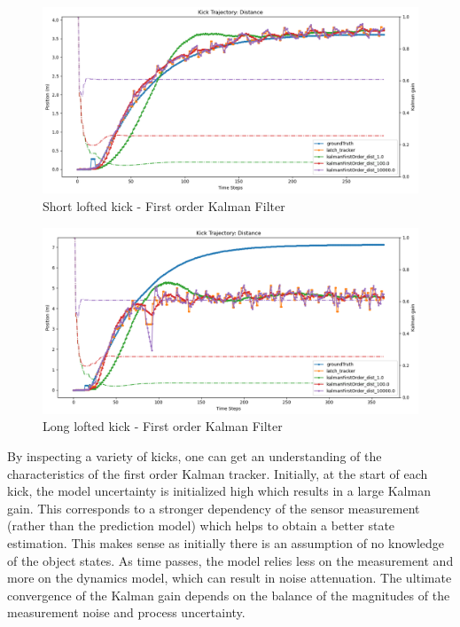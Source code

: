 \documentclass[a4paper,twoside,12pt]{report}
\begin{document}
\begin{figure}[h!]
\begin{center}
\includegraphics[width=12cm]{images/fok_loft_short.png}
\caption{Short lofted kick - First order Kalman Filter}
\label{fig:fokloftshort}
\end{center}
\end{figure}

\begin{figure}[h!]
\begin{center}
\includegraphics[width=12cm]{images/fok_loft_long.png}
\caption{Long lofted kick - First order Kalman Filter}
\label{fig:fokloftlong}
\end{center}
\end{figure}

By inspecting a variety of kicks, one can get an understanding of the characteristics of the first order Kalman tracker. Initially, at the start of each kick, the model uncertainty is initialized high which results in a large Kalman gain. This corresponds to a stronger dependency of the sensor measurement (rather than the prediction model) which helps to obtain a better state estimation. This makes sense as initially there is an assumption of no knowledge of the object states. As time passes, the model relies less on the measurement and more on the dynamics model, which can result in noise attenuation. The ultimate convergence of the Kalman gain depends on the balance of the magnitudes of the measurement noise and process uncertainty.
\end{document}
